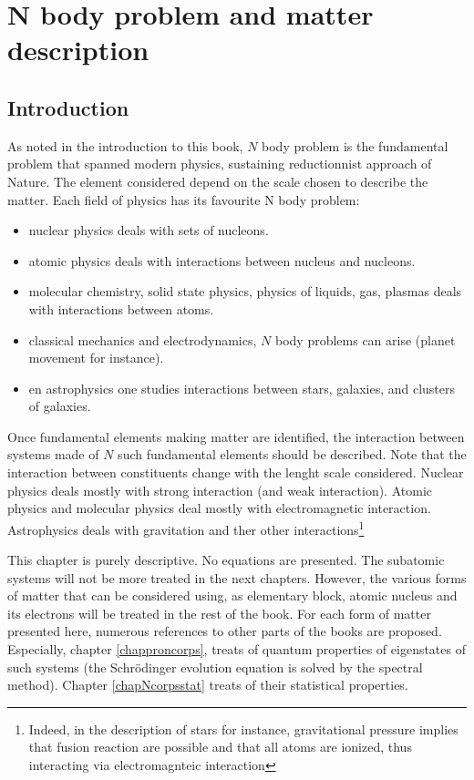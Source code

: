 \documentclass[12pt]{book}
\begin{document}
\chapter{N body problem and matter description}\label{chapnbodpmatter}
\section{Introduction}
As noted in the introduction to this book, $N$ body
problem\cite{ph:physt:March95,ph:physt:Mattuck92}  is the
fundamental 
problem that spanned modern physics, sustaining reductionnist approach
of Nature. 
The element considered depend on the scale chosen to describe the matter.
Each field of physics has its favourite N body problem:
\begin{itemize}
\item nuclear physics deals with sets of nucleons.
\item atomic physics deals with interactions between nucleus and nucleons.
\item molecular chemistry, solid state physics, physics
of liquids, gas, plasmas deals with interactions between atoms.
\item classical mechanics and electrodynamics, $N$ body problems can arise
  (planet movement for instance). 
\item en astrophysics one studies interactions between stars, galaxies, and
  clusters of galaxies.
\end{itemize}
Once fundamental elements making matter are identified, the interaction
between systems made of $N$ such fundamental elements should be
described.  Note that the interaction between constituents change with the
lenght scale considered. Nuclear 
physics deals mostly with strong interaction (and weak
interaction). Atomic physics and molecular physics deal 
mostly with electromagnetic interaction. Astrophysics deals with
gravitation and ther other interactions\footnote{Indeed, in the
description of stars for instance, gravitational pressure implies that
fusion reaction are possible and that all atoms are ionized, thus
interacting via electromagnteic interaction}%

This chapter is purely descriptive. No equations are presented. The
subatomic systems will not be more treated in the next
chapters. However, the various forms of matter that can be considered
using, as elementary block, atomic nucleus and its electrons will be treated in
the rest of the book. For each form of matter presented here, numerous
references to other parts of the books are proposed. Especially, chapter 
\ref{chapproncorps}, treats of quantum properties of eigenstates of such
systems (the Schr\"odinger evolution equation is solved by the spectral
method). Chapter \ref{chapNcorpsstat} treats of their statistical properties.
\end{document}
